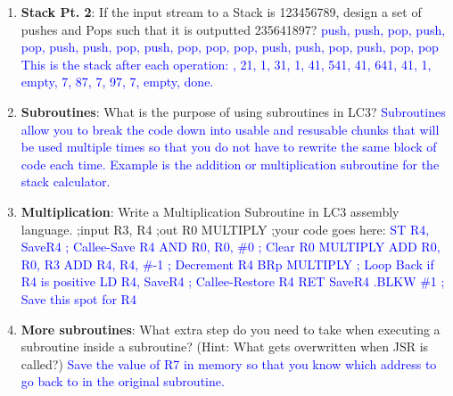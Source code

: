 \documentclass{article}
\begin{document}
\begin{enumerate}[label=(\alph*)]
    \item \textbf{Stack Pt. 2}: If the input stream to a Stack is 123456789, design a set of pushes and Pops such that it is outputted 235641897?
    \newline\textcolor{blue}{push, push, pop, push, pop, push, push, pop, push, pop, pop, pop, push, push, pop, push, pop, pop
    This is the stack after each operation: , 21, 1, 31, 1, 41, 541, 41, 641, 41, 1, empty, 7, 87, 7, 97, 7,  empty, done.
    }
    \item \textbf{Subroutines}: What is the purpose of using subroutines in LC3?
    \newline\textcolor{blue}{ Subroutines allow you to break the code down into usable and resusable chunks that will be used multiple times so that you do not have to rewrite the same block of code each time. Example is the addition or multiplication subroutine for the stack calculator.
    }
    \item \textbf{Multiplication}: Write a Multiplication Subroutine in LC3 assembly language.
    \newline
    ;input R3, R4 \newline
    ;out R0 \newline
    MULTIPLY \newline
    ;your code goes here: \newline
    \newline\textcolor{blue}{
    ST R4, SaveR4    \hfill ; Callee-Save R4 \newline
    AND R0, R0, \#0   \hfill ; Clear R0 \newline
    MULTIPLY \newline
    ADD R0, R0, R3 \hfill \newline
    ADD R4, R4, \#-1 \hfill ; Decrement R4 \newline
    BRp MULTIPLY \hfill ; Loop Back if R4 is positive \newline
    \newline
    LD R4, SaveR4 \hfill ; Callee-Restore R4
    \newline
    RET
    \newline
    SaveR4 .BLKW \#1 \hfill ; Save this spot for R4}

    \item 
    \textbf{More subroutines}: What extra step do you need to take when executing a subroutine inside a subroutine? (Hint: What gets overwritten when JSR is called?)\newline
    \textcolor{blue}{ Save the value of R7 in memory so that you know which address to go back to in the original subroutine.}
    \end{enumerate}
    
\end{document}

